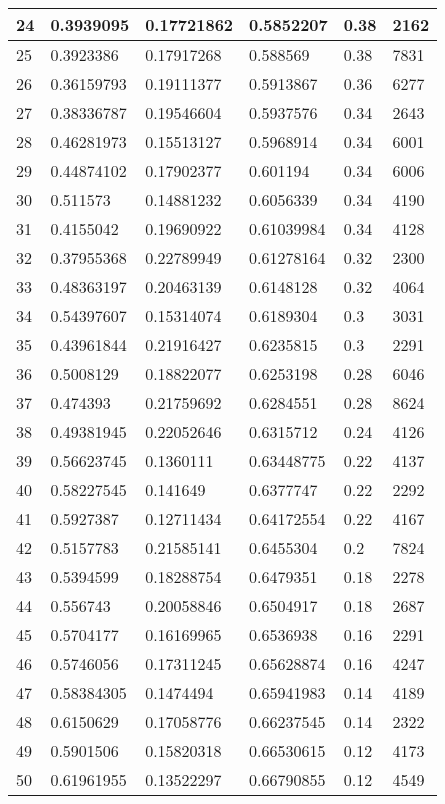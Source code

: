 \begin{longtable}{|l|l|l|l|l|l|}
24 & 0.3939095 & 0.17721862 & 0.5852207 & 0.38 & 2162 \\ \hline 
25 & 0.3923386 & 0.17917268 & 0.588569 & 0.38 & 7831 \\ \hline 
26 & 0.36159793 & 0.19111377 & 0.5913867 & 0.36 & 6277 \\ \hline 
27 & 0.38336787 & 0.19546604 & 0.5937576 & 0.34 & 2643 \\ \hline 
28 & 0.46281973 & 0.15513127 & 0.5968914 & 0.34 & 6001 \\ \hline 
29 & 0.44874102 & 0.17902377 & 0.601194 & 0.34 & 6006 \\ \hline 
30 & 0.511573 & 0.14881232 & 0.6056339 & 0.34 & 4190 \\ \hline 
31 & 0.4155042 & 0.19690922 & 0.61039984 & 0.34 & 4128 \\ \hline 
32 & 0.37955368 & 0.22789949 & 0.61278164 & 0.32 & 2300 \\ \hline 
33 & 0.48363197 & 0.20463139 & 0.6148128 & 0.32 & 4064 \\ \hline 
34 & 0.54397607 & 0.15314074 & 0.6189304 & 0.3 & 3031 \\ \hline 
35 & 0.43961844 & 0.21916427 & 0.6235815 & 0.3 & 2291 \\ \hline 
36 & 0.5008129 & 0.18822077 & 0.6253198 & 0.28 & 6046 \\ \hline 
37 & 0.474393 & 0.21759692 & 0.6284551 & 0.28 & 8624 \\ \hline 
38 & 0.49381945 & 0.22052646 & 0.6315712 & 0.24 & 4126 \\ \hline 
39 & 0.56623745 & 0.1360111 & 0.63448775 & 0.22 & 4137 \\ \hline 
40 & 0.58227545 & 0.141649 & 0.6377747 & 0.22 & 2292 \\ \hline 
41 & 0.5927387 & 0.12711434 & 0.64172554 & 0.22 & 4167 \\ \hline 
42 & 0.5157783 & 0.21585141 & 0.6455304 & 0.2 & 7824 \\ \hline 
43 & 0.5394599 & 0.18288754 & 0.6479351 & 0.18 & 2278 \\ \hline 
44 & 0.556743 & 0.20058846 & 0.6504917 & 0.18 & 2687 \\ \hline 
45 & 0.5704177 & 0.16169965 & 0.6536938 & 0.16 & 2291 \\ \hline 
46 & 0.5746056 & 0.17311245 & 0.65628874 & 0.16 & 4247 \\ \hline 
47 & 0.58384305 & 0.1474494 & 0.65941983 & 0.14 & 4189 \\ \hline 
48 & 0.6150629 & 0.17058776 & 0.66237545 & 0.14 & 2322 \\ \hline 
49 & 0.5901506 & 0.15820318 & 0.66530615 & 0.12 & 4173 \\ \hline 
50 & 0.61961955 & 0.13522297 & 0.66790855 & 0.12 & 4549 \\ \hline 
\end{longtable}